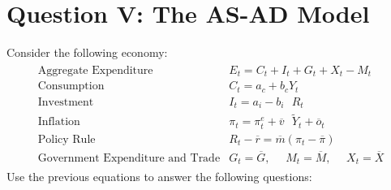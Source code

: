 \documentclass[letterpaper,12pt]{article}
\theoremstyle{dotlessS}
\begin{document}
\section*{Question V: The AS-AD Model}
Consider the following economy:
\begin{eqnarray*}
\begin{array}{ll}
\text{Aggregate Expenditure} & E_t=C_t+I_t+G_t+X_t-M_t \\[1.4ex]
\text{Consumption} & C_t=a_c+b_c Y_t \\[1.4ex]
\text{Investment} & I_t=a_i-b_i \: \: \: R_t \\[1.4ex]
\text{Inflation} & \pi_t=\pi^e_t+\overline{v} \: \: \: \widetilde{Y}_t+\overline{o}_t  \\[1.4ex]
\text{Policy Rule} & R_t-\overline{r}=\overline{m}(\pi_t-\overline{\pi})  \\[1.4ex]
\text{Government Expenditure and Trade} & G_t=\overline{G}, \: \: \: \: \: \: M_t=\overline{M}, \: \: \: \: \: \: X_t=\overline{X}
\end{array}
\end{eqnarray*}
Use the previous equations to answer the following questions:
\end{document}
